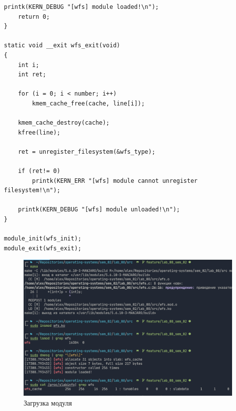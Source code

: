 \begin{lstlisting}[caption=Текст программы]
    printk(KERN_DEBUG "[wfs] module loaded!\n");
    return 0;
}

static void __exit wfs_exit(void)
{
    int i;
    int ret;

    for (i = 0; i < number; i++)
        kmem_cache_free(cache, line[i]);

    kmem_cache_destroy(cache);
    kfree(line);

    ret = unregister_filesystem(&wfs_type);

    if (ret!= 0)
        printk(KERN_ERR "[wfs] module cannot unregister filesystem!\n");

    printk(KERN_DEBUG "[wfs] module unloaded!\n");
}

module_init(wfs_init);
module_exit(wfs_exit);
\end{lstlisting}

\begin{figure}[H]
    \centering
    \includegraphics[scale=0.4]{img/insmod.png}
    \caption{Загрузка модуля}
\end{figure}

